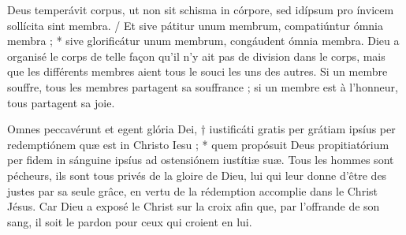 \documentclass[Session2025.tex]{subfiles}
\begin{document}
{Deus temperávit corpus, ut non sit schisma in córpore, sed idípsum
pro ínvicem sollícita sint membra. / Et sive pátitur unum membrum,
compatiúntur ómnia membra ; * sive glorificátur unum membrum,
congáudent ómnia membra.}
{Dieu a organisé le corps de telle façon qu’il n’y ait pas de division dans
le corps, mais que les différents membres aient tous le souci les uns des
autres. Si un membre souffre, tous les membres partagent sa souffrance ;
si un membre est à l’honneur, tous partagent sa joie.}










{Omnes peccavérunt et egent glória Dei, † iustificáti gratis per grátiam
ipsíus per redemptiónem quæ est in Christo Iesu ; * quem propósuit Deus
propitiatórium per fidem in sánguine ipsíus ad ostensiónem iustítiæ suæ.}
{Tous les hommes sont pécheurs, ils sont tous privés de la gloire de Dieu,
lui qui leur donne d’être des justes par sa seule grâce, en vertu de la
rédemption accomplie dans le Christ Jésus. Car Dieu a exposé le Christ
sur la croix afin que, par l’offrande de son sang, il soit le pardon pour
ceux qui croient en lui.}
\end{document}

